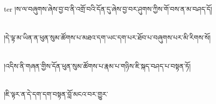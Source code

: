 ter{ }།ས་ལ་བཞུགས་ཞེས་བྱ་བ་ནི་འགྲོ་བའི་དོན་དུ་ཞེས་བྱ་བར་ཤུགས་ཀྱིས་གོ་བས་ན་མ་བཤད་དོ།\chapter{ }།དེ་ལྟ་མ་ཡིན་ན་ཕུན་སུམ་ཚོགས་པ་མཐའ་དག་ཡང་དག་པར་ཐོབ་པ་བཞུགས་པར་མི་རིགས་སོ།\chapter{ }།འདིས་ནི་གཞན་གྱིས་དོན་ཕུན་སུམ་ཚོགས་པ་རྣམ་པ་གཉིས་ཇི་སྐད་བཤད་པ་བསྟན་ཏོ།\chapter{ }།ཇི་ལྟར་ན་དེ་དག་དག་བསྟན་བློ་མངའ་བར་གྱུར་